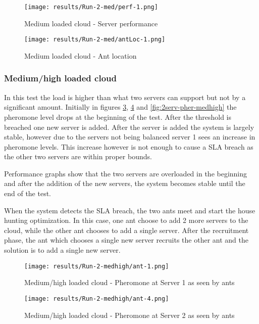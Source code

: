 \begin{figure}
	\centering
		\texttt{[image: results/Run-2-med/perf-1.png]}
	\caption{Medium loaded cloud - Server performance}
	\label{fig:2serv-perf-med}
\end{figure}

\begin{figure}
	\centering
		\texttt{[image: results/Run-2-med/antLoc-1.png]}
	\caption{Medium loaded cloud - Ant location}
	\label{fig:2serv-antloc-med}
\end{figure}

\subsubsection{Medium/high loaded cloud}

In this test the load is higher than what two servers can support but not by a significant amount. Initially in figures \ref{fig:2serv-ant1-medhigh}, \ref{fig:2serv-ant5-medhigh} and \ref{fig:2serv-pher-medhigh} the pheromone level drops at the beginning of the test. After the threshold is breached one new server is added. After the server is added the system is largely stable, however due to the servers not being balanced server 1 sees an increase in pheromone levels. This increase however is not enough to cause a SLA breach as the other two servers are within proper bounds.

Performance graphs show that the two servers are overloaded in the beginning and after the addition of the new servers, the system becomes stable until the end of the test.

When the system detects the SLA breach, the two ants meet and start the house hunting optimization. In this case, one ant choose to add 2 more servers to the cloud, while the other ant chooses to add a single server. After the recruitment phase, the ant which chooses a single new server recruits the other ant and the solution is to add a single new server.

\begin{figure}[!ht]
	\centering
		\texttt{[image: results/Run-2-medhigh/ant-1.png]}
	\caption{Medium/high loaded cloud - Pheromone at Server 1 as seen by ants}
	\label{fig:2serv-ant1-medhigh}
\end{figure}

\begin{figure}
	\centering
		\texttt{[image: results/Run-2-medhigh/ant-4.png]}
	\caption{Medium/high loaded cloud - Pheromone at Server 2 as seen by ants}
	\label{fig:2serv-ant5-medhigh}
\end{figure}

